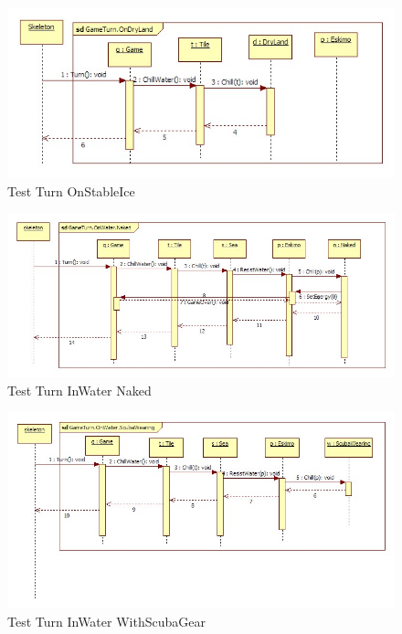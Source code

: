 \begin{figure}[H]
	\begin{center}
		\includegraphics[width=17cm]{chapters/chapter05/diagrams/Test_Turn_OnStableIce.jpg}
		\caption{Test Turn OnStableIce}
		\label{fig:Test Turn OnStableIce}
	\end{center}
\end{figure}

\begin{figure}[H]
	\begin{center}
		\includegraphics[width=17cm]{chapters/chapter05/diagrams/Test_Turn_InWater_Naked.jpg}
		\caption{Test Turn InWater Naked}
		\label{fig:Test Turn InWater Naked}
	\end{center}
\end{figure}

\begin{figure}[H]
	\begin{center}
		\includegraphics[width=17cm]{chapters/chapter05/diagrams/Test_Turn_InWater_WithScubaGear.jpg}
		\caption{Test Turn InWater WithScubaGear}
		\label{fig:Test Turn InWater WithScubaGear}
	\end{center}
\end{figure}

